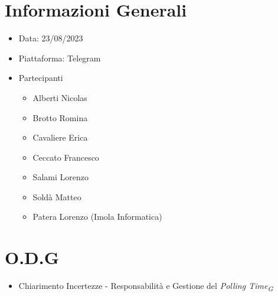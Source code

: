 \documentclass[a4paper, 12pt]{article}
\begin{document}
\makefrontpage
\section*{Informazioni Generali}
\begin{itemize}
    \item Data: 23/08/2023
    \item Piattaforma: Telegram
    \item Partecipanti
          \begin{itemize}
              \item Alberti Nicolas
              \item Brotto Romina
              \item Cavaliere Erica
              \item Ceccato Francesco
              \item Salami Lorenzo
              \item Soldà Matteo
              \item Patera Lorenzo (Imola Informatica)
          \end{itemize}
\end{itemize}
\section*{O.D.G}
\begin{itemize}
    \item Chiarimento Incertezze - Responsabilità e Gestione del \textit{Polling Time\textsubscript{G}}
\end{itemize}
\end{document}
